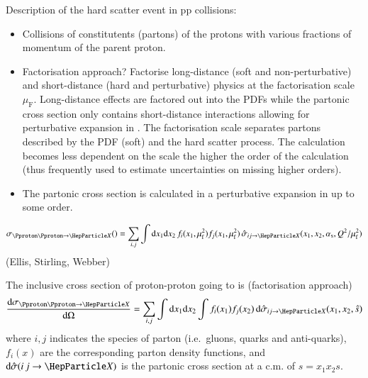 Description of the hard scatter event in pp collisions:
\begin{itemize}
\item Collisions of constitutents (partons) of the protons with
  various fractions of momentum of the parent proton.

\item Factorisation approach? Factorise long-distance (soft and
  non-perturbative) and short-distance (hard and perturbative) physics
  at the factorisation scale $\mu_\text{F}$. Long-distance effects are
  factored out into the PDFs while the partonic cross section only
  contains short-distance interactions allowing for perturbative
  expansion in \alphas. The factorisation scale separates partons
  described by the PDF (soft) and the hard scatter process. The
  calculation becomes less dependent on the scale the higher the order
  of the calculation (thus frequently used to estimate uncertainties
  on missing higher orders).

\item The partonic cross section is calculated in a perturbative
  expansion in \alphas up to some order.
\end{itemize}

\begin{align*}
  \sigma_{\Pproton\Pproton \ra \PX}() = \sum_{i,j} \int \mathrm{d}x_1 \mathrm{d}x_2 \, f_i(x_1, \muF^2) f_j(x_1, \muF^2) \, \hat{\sigma}_{i j \ra \PX}(x_1, x_2, \alphas, Q^2 / \muF^2)
\end{align*}
(Ellis, Stirling, Webber)



The inclusive cross section of proton-proton going to \PX is (factorisation approach)
\begin{align*}
  \frac{\mathrm{d}\sigma_{\Pproton\Pproton \ra \PX}}{\mathrm{d}\Omega} = \sum_{i,j} \int \mathrm{d}x_1 \mathrm{d}x_2 \int f_i(x_1) f_j(x_2) \, \mathrm{d}\hat{\sigma}_{i j \ra \PX}(x_1, x_2, \hat{s})
\end{align*}
where $i, j$ indicates the species of parton (i.e.\ gluons, quarks and
anti-quarks), $f_i(x)$ are the corresponding parton density functions,
and $\mathrm{d}\hat{\sigma}(i\,j \ra \PX)$ is the partonic cross
section at a c.m. of $\hat{s} = x_1 x_2 s$.


